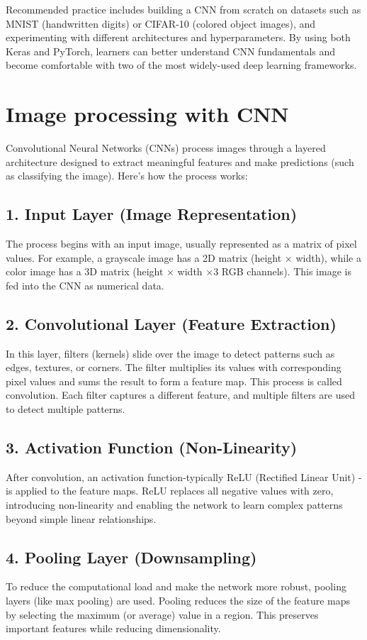 \documentclass[10pt]{article}
\begin{document}
Recommended practice includes building a CNN from scratch on datasets such as MNIST (handwritten digits) or CIFAR-10 (colored object images), and experimenting with different architectures and hyperparameters. By using both Keras and PyTorch, learners can better understand CNN fundamentals and become comfortable with two of the most widely-used deep learning frameworks.

\section*{Image processing with CNN}
Convolutional Neural Networks (CNNs) process images through a layered architecture designed to extract meaningful features and make predictions (such as classifying the image). Here's how the process works:

\subsection*{1. Input Layer (Image Representation)}
The process begins with an input image, usually represented as a matrix of pixel values. For example, a grayscale image has a 2D matrix (height × width), while a color image has a 3D matrix (height × width $\times 3$ RGB channels). This image is fed into the CNN as numerical data.

\subsection*{2. Convolutional Layer (Feature Extraction)}
In this layer, filters (kernels) slide over the image to detect patterns such as edges, textures, or corners. The filter multiplies its values with corresponding pixel values and sums the result to form a feature map. This process is called convolution. Each filter captures a different feature, and multiple filters are used to detect multiple patterns.

\subsection*{3. Activation Function (Non-Linearity)}
After convolution, an activation function-typically ReLU (Rectified Linear Unit) - is applied to the feature maps. ReLU replaces all negative values with zero, introducing non-linearity and enabling the network to learn complex patterns beyond simple linear relationships.

\subsection*{4. Pooling Layer (Downsampling)}
To reduce the computational load and make the network more robust, pooling layers (like max pooling) are used. Pooling reduces the size of the feature maps by selecting the maximum (or average) value in a region. This preserves important features while reducing dimensionality.
\end{document}
